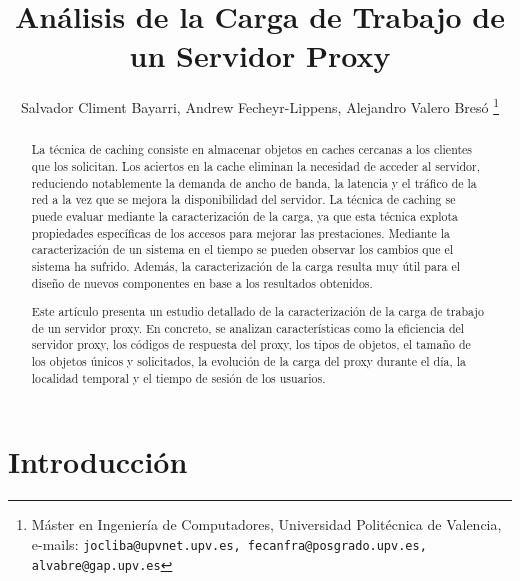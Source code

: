 \documentclass[twocolumn]{Jornadas}
\begin{document}
\title{Análisis de la Carga de Trabajo de un Servidor Proxy}

\author{%
     Salvador Climent Bayarri, %
     Andrew Fecheyr-Lippens, %
     Alejandro Valero Bresó%
	\thanks{Máster en Ingeniería de Computadores, Universidad Politécnica de Valencia, e-mails: {\tt jocliba@upvnet.upv.es, fecanfra@posgrado.upv.es, alvabre@gap.upv.es}}
     }

\maketitle
\markboth{}{}
\pagestyle{empty}
\thispagestyle{empty} %

\begin{abstract}

La técnica de caching consiste en almacenar objetos en caches cercanas a los clientes que los solicitan. Los aciertos en la cache eliminan la necesidad de acceder al servidor, reduciendo notablemente la demanda de ancho de banda, la latencia y el tráfico de la red a la vez que se mejora la disponibilidad del servidor. La técnica de caching se puede evaluar mediante la caracterización de la carga, ya que esta técnica explota propiedades específicas de los accesos para mejorar las prestaciones. Mediante la caracterización de un sistema en el tiempo se pueden observar los cambios que el sistema ha sufrido. Además, la caracterización de la carga resulta muy útil para el diseño de nuevos componentes en base a los resultados obtenidos.

Este artículo presenta un estudio detallado de la caracterización de la carga de trabajo de un servidor proxy. En concreto, se analizan características como la eficiencia del servidor proxy, los códigos de respuesta del proxy, los tipos de objetos, el tamaño de los objetos únicos y solicitados, la evolución de la carga del proxy durante el día, la localidad temporal y el tiempo de sesión de los usuarios.

\end{abstract}



\section{Introducción}
\label{intro}
\end{document}
